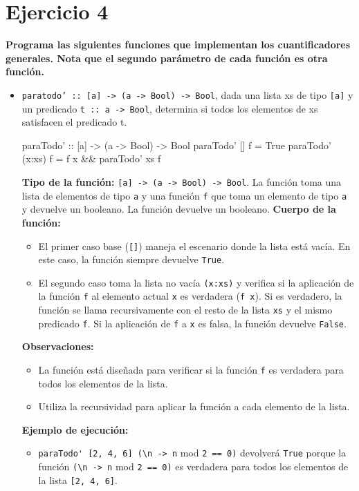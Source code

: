 \documentclass{article}
\begin{document}
\section*{Ejercicio 4}
\textbf{Programa las siguientes funciones que implementan los cuantificadores generales. Nota que el segundo parámetro de cada función es otra función.}
\begin{itemize}
    \item 
\verb|paratodo’ :: [a] -> (a -> Bool) -> Bool|, dada una lista xs de tipo \verb|[a]| y un predicado \verb|t :: a -> Bool|, determina si todos los elementos de xs satisfacen el predicado t.
\begin{haskell}
paraTodo' :: [a] -> (a -> Bool) -> Bool
paraTodo' [] f = True
paraTodo' (x:xs) f = f x && paraTodo' xs f
\end{haskell}    
\textbf{Tipo de la función:} \verb|[a] -> (a -> Bool) -> Bool|. La función toma una lista de elementos de tipo \verb|a| y una función \verb|f| que toma un elemento de tipo \verb|a| y devuelve un booleano. La función devuelve un booleano.
\textbf{Cuerpo de la función:}
\begin{itemize}
    \item El primer caso base (\verb|[]|) maneja el escenario donde la lista está vacía. En este caso, la función siempre devuelve \verb|True|.
    \item El segundo caso toma la lista no vacía \verb|(x:xs)| y verifica si la aplicación de la función \verb|f| al elemento actual \verb|x| es verdadera (\verb|f x|). Si es verdadero, la función se llama recursivamente con el resto de la lista \verb|xs| y el mismo predicado \verb|f|. Si la aplicación de \verb|f| a \verb|x| es falsa, la función devuelve \verb|False|.
\end{itemize}
\textbf{Observaciones:}
\begin{itemize}
    \item La función está diseñada para verificar si la función \verb|f| es verdadera para todos los elementos de la lista.
    \item Utiliza la recursividad para aplicar la función a cada elemento de la lista.
\end{itemize}
\textbf{Ejemplo de ejecución:}
\begin{itemize}
    \item \verb|paraTodo' [2, 4, 6] (\n -> n| mod \verb|2 == 0)| devolverá \verb|True| porque la función \verb|(\n -> n| mod \verb|2 == 0)| es verdadera para todos los elementos de la lista \verb|[2, 4, 6]|.
\end{itemize}


\end{itemize}
\end{document}
